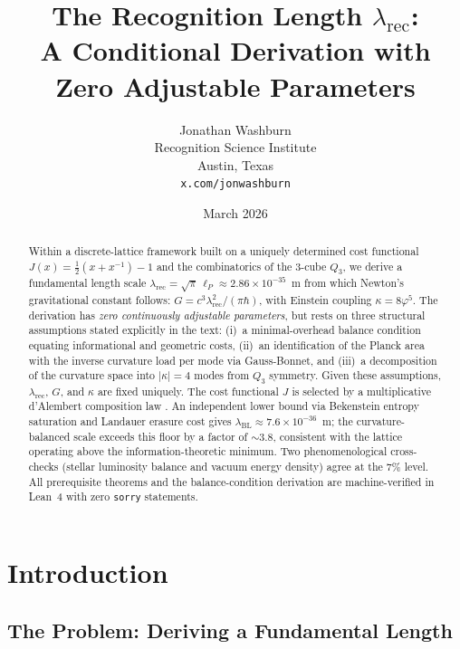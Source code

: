\documentclass[12pt]{article}
\title{The Recognition Length $\lambda_{\mathrm{rec}}$:\\
A Conditional Derivation with Zero Adjustable Parameters}
\author{Jonathan Washburn\\
Recognition Science Institute\\
Austin, Texas\\
\texttt{x.com/jonwashburn}}
\date{March 2026}
\theoremstyle{definition}
\theoremstyle{remark}
\begin{document}
\maketitle

\begin{abstract}
Within a discrete-lattice framework built on a uniquely determined cost
functional $J(x) = \tfrac{1}{2}(x + x^{-1}) - 1$ and the
combinatorics of the 3-cube $Q_3$, we derive a fundamental length
scale $\lambda_{\mathrm{rec}} = \sqrt{\pi}\,\ell_P \approx 2.86
\times 10^{-35}$~m from which Newton's gravitational constant follows:
$G = c^3 \lambda_{\mathrm{rec}}^2/(\pi\hbar)$, with Einstein coupling
$\kappa = 8\varphi^5$. The derivation has \emph{zero continuously
adjustable parameters}, but rests on three structural assumptions
stated explicitly in the text: (i)~a minimal-overhead balance condition
equating informational and geometric costs, (ii)~an identification of
the Planck area with the inverse curvature load per mode via
Gauss-Bonnet, and (iii)~a decomposition of the curvature space into
$|\kappa| = 4$ modes from $Q_3$ symmetry. Given these assumptions,
$\lambda_{\mathrm{rec}}$, $G$, and $\kappa$ are fixed uniquely. The
cost functional $J$ is selected by a multiplicative d'Alembert
composition law
\cite{WashburnZlatanovic2026Math935,WashburnBarghi2026Axioms151,WashburnZlatanovicAllahyarov2026Inevitability}.
An independent lower bound via Bekenstein entropy saturation and
Landauer erasure cost gives $\lambda_{\mathrm{BL}} \approx 7.6 \times
10^{-36}$~m; the curvature-balanced scale exceeds this floor by a
factor of $\sim\!3.8$, consistent with the lattice operating above the
information-theoretic minimum. Two phenomenological cross-checks
(stellar luminosity balance and vacuum energy density) agree at the
7\% level. All prerequisite theorems and the balance-condition
derivation are machine-verified in Lean~4
\cite{WashburnLean4Repo2026} with zero \texttt{sorry} statements.
\end{abstract}

\tableofcontents

\section{Introduction}
\label{sec:intro}

\subsection{The Problem: Deriving a Fundamental Length}
\end{document}
